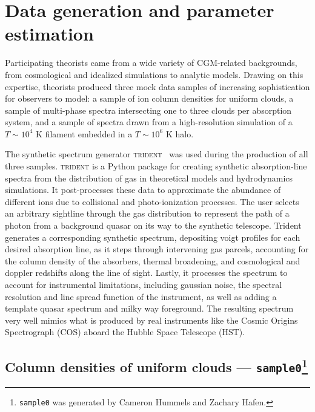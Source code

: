 \documentclass[fleqn,usenatbib]{mnras}
\begin{document}
\section{Data generation and parameter estimation}
\label{s: data generation}

Participating theorists came from a wide variety of CGM-related backgrounds, from cosmological and idealized simulations to analytic models.
Drawing on this expertise, theorists produced three mock data samples of increasing sophistication for observers to model:
a sample of ion column densities for uniform clouds,
a sample of multi-phase spectra intersecting one to three clouds per absorption system,
and a sample of spectra drawn from a high-resolution simulation of a $T \sim 10^4$ K filament embedded in a $T \sim 10^6$ K halo.

The synthetic spectrum generator \textsc{trident}~\citep{Hummels2017} was used during the production of all three samples.  \textsc{trident} is a Python package for creating synthetic absorption-line spectra from the distribution of gas in theoretical models and hydrodynamics simulations. It post-processes these data to approximate the abundance of different ions due to collisional and photo-ionization processes.  The user selects an arbitrary sightline through the gas distribution to represent the path of a photon from a background quasar on its way to the synthetic telescope.  Trident generates a corresponding synthetic spectrum, depositing voigt profiles for each desired absorption line, as it steps through intervening gas parcels, accounting for the column density of the absorbers, thermal broadening, and cosmological and doppler redshifts along the line of sight.  Lastly, it processes the  spectrum to account for instrumental limitations, including gaussian noise, the spectral resolution and line spread function of the instrument, as well as adding a template quasar spectrum and milky way foreground.  The resulting spectrum very well mimics what is produced by real instruments like the Cosmic Origins Spectrograph (COS) aboard the Hubble Space Telescope (HST).

\subsection[Column densities of uniform clouds --- \texttt{sample0}]{Column densities of uniform clouds --- \texttt{sample0}\footnote{
\texttt{sample0} was generated by Cameron Hummels and Zachary Hafen.}}
\label{s: data generation -- sample0}
\end{document}
